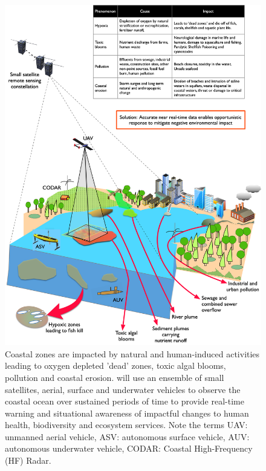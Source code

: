 \documentclass[12pt]{article}
\begin{document}
\begin{figure}[H]
  \centering
  \includegraphics[scale=0.135]{fig/mega-cities-toxic-1.jpg}
  \caption{Coastal zones are impacted by natural and human-induced
    activities leading to oxygen depleted 'dead' zones, toxic algal
    blooms, pollution and coastal erosion. \pro will use an ensemble
    of small satellites, aerial, surface and underwater vehicles to
    observe the coastal ocean over sustained periods of time to
    provide real-time warning and situational awareness of impactful
    changes to human health, biodiversity and ecosystem services. Note
    the terms UAV: unmanned aerial vehicle, ASV: autonomous surface
    vehicle, AUV: autonomous underwater vehicle, CODAR: Coastal
    High-Frequency (HF) Radar.}
    \label{fig:mega-cities}
\end{figure}
\end{document}
